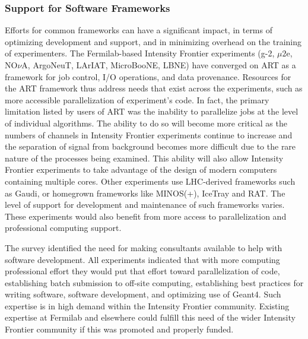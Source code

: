 \subsubsection{Support for Software Frameworks}
Efforts for common frameworks can have a significant impact, in terms of optimizing  development and support, and in
minimizing overhead on the training of experimenters.  The Fermilab-based Intensity Frontier
experiments (g-2, $\mu2$e, NO$\nu$A, ArgoNeuT, LArIAT, MicroBooNE, LBNE) have
converged on ART as a framework for job control, I/O operations, and data provenance. 
Resources for the ART framework thus address needs that
exist across the experiments, such as more accessible parallelization of
experiment's code. In fact, the primary limitation listed by users of ART was
the inability to parallelize jobs at the level of individual algorithms.  The
ability to do so will become more critical as the numbers of channels in Intensity Frontier
experiments continue to increase and the separation of signal from background
becomes more difficult due to the rare nature of the processes being examined.
This ability will also allow Intensity Frontier experiments to take advantage of the design of
modern computers containing multiple cores. Other experiments use LHC-derived
frameworks such as Gaudi, or homegrown frameworks like MINOS(+), IceTray and
RAT. The level of support for development and maintenance of such frameworks
varies. These experiments would also benefit from more access to
parallelization and professional computing support.

The survey identified the need for making consultants available to help with
software development. All experiments indicated that with more computing
professional effort they would put that effort toward parallelization of code,
establishing batch submission to off-site computing, establishing best
practices for writing software, software development, and  optimizing use of
Geant4. Such expertise is in high demand within the Intensity Frontier community. Existing expertise 
at Fermilab and elsewhere could fulfill this need of the
wider Intensity Frontier community if this was promoted and properly funded.

